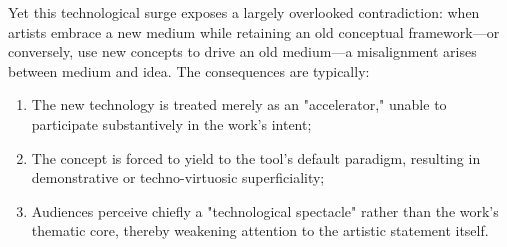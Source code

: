 \documentclass[sigconf,nonacm]{acmart}
\begin{document}
Yet this technological surge exposes a largely overlooked contradiction: when artists embrace a new medium while retaining an old conceptual framework—or conversely, use new concepts to drive an old medium—a misalignment arises between medium and idea. The consequences are typically:  
\begin{enumerate}
    \item The new technology is treated merely as an "accelerator," unable to participate substantively in the work's intent;
    \item The concept is forced to yield to the tool's default paradigm, resulting in demonstrative or techno-virtuosic superficiality;
    \item Audiences perceive chiefly a "technological spectacle" rather than the work's thematic core, thereby weakening attention to the artistic statement itself.
\end{enumerate}
\end{document}
